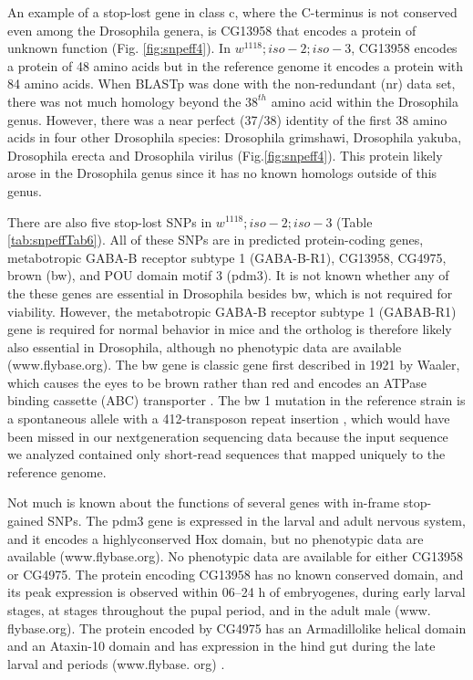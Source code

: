 An example of a stop-lost gene in class c, where the C-terminus is not conserved even among the Drosophila genera, is CG13958 that encodes a protein of unknown function (Fig. \ref{fig:snpeff4}). In $w^{1118} ; iso-2; iso-3$, CG13958 encodes a protein of 48 amino acids but in the reference genome it encodes a protein with 84 amino acids.  When BLASTp was done with the non-redundant (nr) data set, there was not much homology beyond the $38^{th}$ amino acid within the Drosophila genus. However, there was a near perfect (37/38) identity of the first 38 amino acids in four other Drosophila species: Drosophila grimshawi, Drosophila yakuba, Drosophila erecta and Drosophila virilus (Fig.\ref{fig:snpeff4}). This protein likely arose in the Drosophila genus since it has no known homologs outside of this genus.

There are also five stop-lost SNPs in $w^{1118} ; iso-2; iso-3$ (Table \ref{tab:snpeffTab6}). All of these SNPs are in predicted protein-coding genes, metabotropic GABA-B receptor subtype 1 (GABA-B-R1), CG13958, CG4975, brown (bw), and POU domain motif 3 (pdm3). It is not known whether any of the these genes are essential in Drosophila besides bw, which is not required for viability.  However, the metabotropic GABA-B receptor subtype 1 (GABAB-R1) gene is required for normal behavior in mice \cite{jones1998gabab} and the ortholog is therefore likely also essential in Drosophila, although no phenotypic data are available (www.flybase.org). The bw gene is classic gene first described in 1921 by Waaler, \cite{waaler1921location} which causes the eyes to be brown rather than red and encodes an ATPase binding cassette (ABC) transporter \cite{saurin1999getting}. The bw 1 mutation in the reference strain is a spontaneous allele with a 412-transposon repeat insertion \cite{dreesen1988brown}, which would have been missed in our nextgeneration sequencing data because the input sequence we analyzed contained only short-read sequences that mapped uniquely to the reference genome.

Not much is known about the functions of several genes with in-frame stop-gained SNPs. The pdm3 gene is expressed in the larval and adult nervous system, and it encodes a highlyconserved Hox domain, but no phenotypic data are available (www.flybase.org). No phenotypic data are available for either CG13958 or CG4975. The protein encoding CG13958 has no known conserved domain, and its peak expression is observed within 06–24 h of embryogenes, during early larval stages, at stages throughout the pupal period, and in the adult male (www.  flybase.org). The protein encoded by CG4975 has an Armadillolike helical domain and an Ataxin-10 domain and has expression in the hind gut during the late larval and periods (www.flybase.  org) \cite{chintapalli2007using}.

